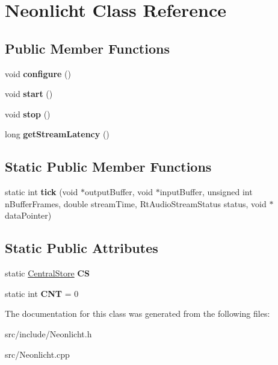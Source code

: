 \hypertarget{classNeonlicht}{\section{Neonlicht Class Reference}
\label{classNeonlicht}
}
\subsection*{Public Member Functions}
\begin{DoxyCompactItemize}
\item 
\hypertarget{classNeonlicht_a32ec4c221148d01bbafd1637ced9b130}{void {\bfseries configure} ()}\label{classNeonlicht_a32ec4c221148d01bbafd1637ced9b130}

\item 
\hypertarget{classNeonlicht_aae54e46be4d251ce4e062cd777994a69}{void {\bfseries start} ()}\label{classNeonlicht_aae54e46be4d251ce4e062cd777994a69}

\item 
\hypertarget{classNeonlicht_a9d1f643b1a2394f9cd181149f7558c72}{void {\bfseries stop} ()}\label{classNeonlicht_a9d1f643b1a2394f9cd181149f7558c72}

\item 
\hypertarget{classNeonlicht_a4354cc2fa6d7bd22e89d1314e375f54f}{long {\bfseries get\-Stream\-Latency} ()}\label{classNeonlicht_a4354cc2fa6d7bd22e89d1314e375f54f}

\end{DoxyCompactItemize}
\subsection*{Static Public Member Functions}
\begin{DoxyCompactItemize}
\item 
\hypertarget{classNeonlicht_a57c3e8d4154418c9efc4b48d45b732d6}{static int {\bfseries tick} (void $\ast$output\-Buffer, void $\ast$input\-Buffer, unsigned int n\-Buffer\-Frames, double stream\-Time, Rt\-Audio\-Stream\-Status status, void $\ast$data\-Pointer)}\label{classNeonlicht_a57c3e8d4154418c9efc4b48d45b732d6}

\end{DoxyCompactItemize}
\subsection*{Static Public Attributes}
\begin{DoxyCompactItemize}
\item 
\hypertarget{classNeonlicht_a1ac3a31190125df3763a9f3d2f085d5e}{static \hyperlink{classCentralStore}{Central\-Store} {\bfseries C\-S}}\label{classNeonlicht_a1ac3a31190125df3763a9f3d2f085d5e}

\item 
\hypertarget{classNeonlicht_ac86fbdabd4683feaac58b4aefbdf6695}{static int {\bfseries C\-N\-T} = 0}\label{classNeonlicht_ac86fbdabd4683feaac58b4aefbdf6695}

\end{DoxyCompactItemize}


The documentation for this class was generated from the following files\-:\begin{DoxyCompactItemize}
\item 
src/include/Neonlicht.\-h\item 
src/Neonlicht.\-cpp\end{DoxyCompactItemize}
